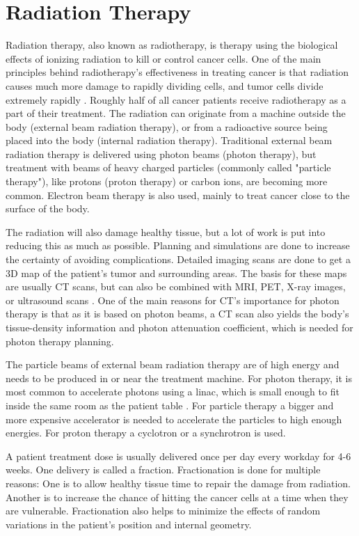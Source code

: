 \documentclass[../main/thesis.tex]{subfiles}
\begin{document}
\section{Radiation Therapy}
\label{t-therapy}
Radiation therapy, also known as radiotherapy, is therapy using the biological effects of ionizing radiation to kill or control cancer cells. One of the main principles behind radiotherapy's effectiveness in treating cancer is that radiation causes much more damage to rapidly dividing cells, and tumor cells divide extremely rapidly \citep[chap. 45]{Serway}. Roughly half of all cancer patients receive radiotherapy as a part of their treatment. The radiation can originate from a machine outside the body (external beam radiation therapy), or from a radioactive source being placed into the body (internal radiation therapy). Traditional external beam radiation therapy is delivered using photon beams (photon therapy), but treatment with beams of heavy charged particles (commonly called "particle therapy"), like protons (proton therapy) or carbon ions, are becoming more common. Electron beam therapy is also used, mainly to treat cancer close to the surface of the body. \citep{nih}

The radiation will also damage healthy tissue, but a lot of work is put into reducing this as much as possible. Planning and simulations are done to increase the certainty of avoiding complications. Detailed imaging scans are done to get a 3D map of the patient's tumor and surrounding areas. The basis for these maps are usually \gls{CT} scans, but can also be combined with \gls{MRI}, \gls{PET}, X-ray images, or ultrasound scans \citep{nih}. One of the main reasons for \gls{CT}'s importance for photon therapy is that as it is based on photon beams, a \gls{CT} scan also yields the body's tissue-density information and photon attenuation coefficient, which is needed for photon therapy planning.  \citep[chap. 12]{Khan}

The particle beams of external beam radiation therapy are of high energy and needs to be produced in or near the treatment machine. For photon therapy, it is most common to accelerate photons using a \gls{linac}, which is small enough to fit inside the same room as the patient table \citep{nih}. For particle therapy a bigger and more expensive accelerator is needed to accelerate the particles to high enough energies. For proton therapy a cyclotron or a synchrotron is used. \citep[chap. 27]{Khan}

A patient treatment dose is usually delivered once per day every workday for 4-6 weeks. One delivery is called a fraction. Fractionation is done for multiple reasons: One is to allow healthy tissue time to repair the damage from radiation. Another is to increase the chance of hitting the cancer cells at a time when they are vulnerable. Fractionation also helps to minimize the effects of random variations in the patient's position and internal geometry. \citep{fractionation} \citep{hysing-uncertain}
\end{document}
